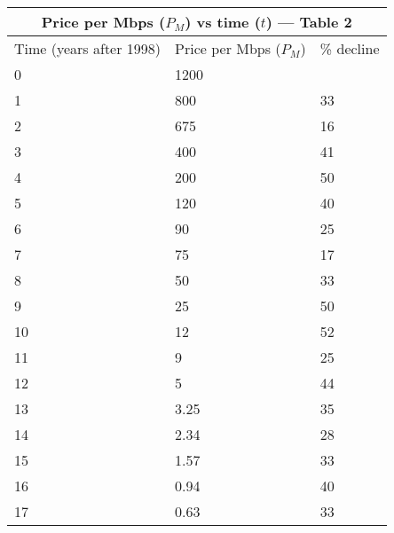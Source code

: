     \begin{center}
        
\begin{tabular}{|l|l|l|}
\hline
\multicolumn{3}{|c|}{Price per Mbps ($P_M$) vs time ($t$) — Table 2} \\ \hline
Time (years after 1998)   & Price per Mbps ($P_M$)   & \% decline  \\ \hline
0                         & 1200                  &             \\ \hline
1                         & 800                   & 33          \\ \hline
2                         & 675                   & 16          \\ \hline
3                         & 400                   & 41          \\ \hline
4                         & 200                   & 50          \\ \hline
5                         & 120                   & 40          \\ \hline
6                         & 90                    & 25          \\ \hline
7                         & 75                    & 17          \\ \hline
8                         & 50                    & 33          \\ \hline
9                         & 25                    & 50          \\ \hline
10                        & 12                    & 52          \\ \hline
11                        & 9                     & 25          \\ \hline
12                        & 5                     & 44          \\ \hline
13                        & 3.25                  & 35          \\ \hline
14                        & 2.34                  & 28          \\ \hline
15                        & 1.57                  & 33          \\ \hline
16                        & 0.94                  & 40          \\ \hline
17                        & 0.63                  & 33          \\ \hline
\end{tabular}

    \end{center}
	
